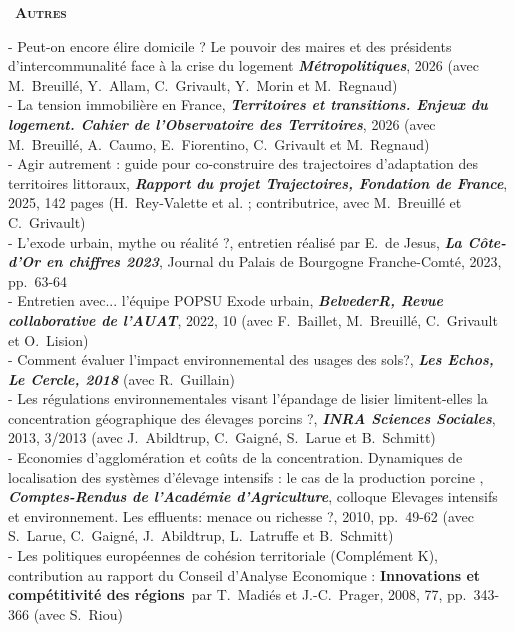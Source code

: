 \documentclass[a4paper,12pt]{article}
\newcommand{\smalltitre}[1]{%
	\noindent \textbullet~\textsc{\textbf{#1}}
	\smallskip
	}
\begin{document}

\smalltitre{Autres} \medskip

\noindent 
- Peut-on encore élire domicile ? Le pouvoir des maires et des présidents d'intercommunalité face à la crise du logement \textit{\textbf{Métropolitiques}}, 2026 (avec M.~Breuillé, Y.~Allam, C.~Grivault, Y.~Morin et M.~Regnaud) \\
- La tension immobilière en France, \textit{\textbf{Territoires et transitions. Enjeux du logement. Cahier de l'Observatoire des Territoires}}, 2026 (avec M.~Breuillé, A.~Caumo, E.~Fiorentino, C.~Grivault et M.~Regnaud) \\
- \og{}Agir autrement\fg{} : guide pour co-construire des trajectoires d'adaptation des territoires littoraux, \textit{\textbf{Rapport du projet Trajectoires, Fondation de France}}, 2025, 142 pages (H.~Rey-Valette et al. ; contributrice, avec M.~Breuillé et C.~Grivault) \\
- L'exode urbain, mythe ou réalité ?, entretien réalisé par E.~de Jesus, \textit{\textbf{La Côte-d'Or en chiffres 2023}}, Journal du Palais de Bourgogne Franche-Comté, 2023, pp.~63-64 \\
- Entretien avec... l'équipe POPSU Exode urbain, \textit{\textbf{BelvederR, Revue collaborative de l'AUAT}}, 2022, 10 (avec F.~Baillet, M.~Breuillé, C.~Grivault et O.~Lision) \\
- Comment évaluer l'impact environnemental des usages des sols?, \textit{\textbf{Les Echos, Le Cercle, 2018}} (avec R.~Guillain) \\
- Les régulations environnementales visant l'épandage de lisier limitent-elles la concentration géographique des élevages porcins ?, \textit{\textbf{INRA Sciences Sociales}}, 2013, 3/2013 (avec J.~Abildtrup, C.~Gaigné, S.~Larue et B.~Schmitt) \\
- Economies d'agglomération et coûts de la concentration. Dynamiques de localisation des systèmes d'élevage intensifs : le cas de la production porcine , \textit{\textbf{Comptes-Rendus de l'Académie d'Agriculture}}, colloque Elevages intensifs et environnement. Les effluents: menace ou richesse ?, 2010, pp.~49-62 (avec S.~Larue, C.~Gaigné, J.~Abildtrup, L.~Latruffe et B.~Schmitt) \\
- Les politiques européennes de cohésion territoriale (Complément K), contribution au rapport du Conseil d'Analyse Economique : \og\textbf{Innovations et compétitivité des régions}\fg~par T.~Madiés et J.-C.~Prager, 2008, 77, pp.~343-366 (avec S.~Riou) \\
\end{document}

